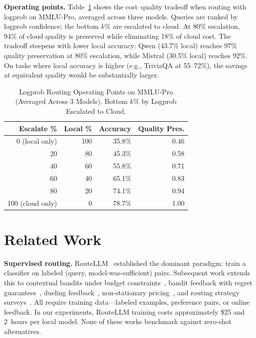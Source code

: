 \documentclass[journal]{IEEEtran}
\begin{document}
\textbf{Operating points.} Table~\ref{tab:operating} shows the cost--quality tradeoff when routing with logprob on MMLU-Pro, averaged across three models. Queries are ranked by logprob confidence; the bottom $k$\% are escalated to cloud. At 80\% escalation, 94\% of cloud quality is preserved while eliminating 18\% of cloud cost. The tradeoff steepens with lower local accuracy: Qwen (43.7\% local) reaches 97\% quality preservation at 80\% escalation, while Mistral (30.5\% local) reaches 92\%. On tasks where local accuracy is higher (e.g., TriviaQA at 55--72\%), the savings at equivalent quality would be substantially larger.

\begin{table}[t]
\centering
\caption{Logprob Routing Operating Points on MMLU-Pro (Averaged Across 3 Models). Bottom $k$\% by Logprob Escalated to Cloud.}
\label{tab:operating}
\small
\begin{tabular}{rrrr}
\toprule
Escalate \% & Local \% & Accuracy & Quality Pres. \\
\midrule
0 (local only) & 100 & 35.8\% & 0.46 \\
20 & 80 & 45.3\% & 0.58 \\
40 & 60 & 55.8\% & 0.71 \\
60 & 40 & 65.1\% & 0.83 \\
80 & 20 & 74.1\% & 0.94 \\
100 (cloud only) & 0 & 78.7\% & 1.00 \\
\bottomrule
\end{tabular}
\end{table}

\section{Related Work}
\label{sec:related}

\textbf{Supervised routing.} RouteLLM~\cite{ong2024routellm} established the dominant paradigm: train a classifier on labeled (query, model-was-sufficient) pairs. Subsequent work extends this to contextual bandits under budget constraints~\cite{chen2025adaptive}, bandit feedback with regret guarantees~\cite{soare2025bandit}, dueling feedback~\cite{li2025dueling}, non-stationary pricing~\cite{tabernermiller2026paretobandit}, and routing strategy surveys~\cite{gomes2025routing}. All require training data---labeled examples, preference pairs, or online feedback. In our experiments, RouteLLM training costs approximately \$25 and 2~hours per local model. None of these works benchmark against zero-shot alternatives.
\end{document}
